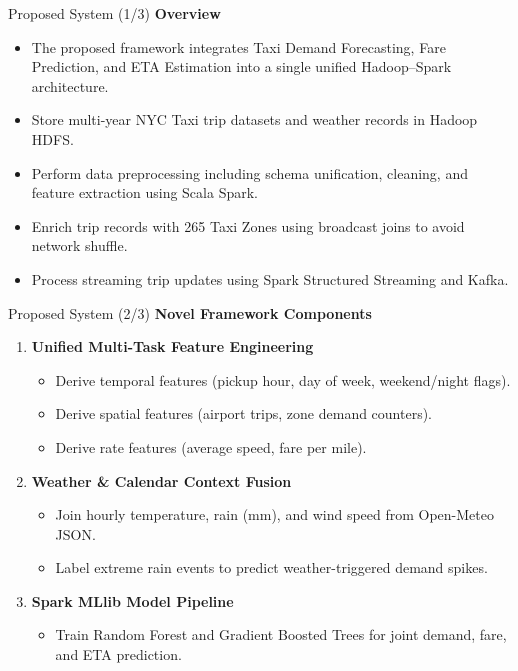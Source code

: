 \documentclass[aspectratio=169]{beamer}
\begin{document}
\begin{frame}{Proposed System (1/3)}
  \textbf{Overview}
  \begin{itemize}
    \item The proposed framework integrates Taxi Demand Forecasting, Fare Prediction, and ETA Estimation into a single unified Hadoop--Spark architecture.
    \item Store multi-year NYC Taxi trip datasets and weather records in Hadoop HDFS.
    \item Perform data preprocessing including schema unification, cleaning, and feature extraction using Scala Spark.
    \item Enrich trip records with 265 Taxi Zones using broadcast joins to avoid network shuffle.
    \item Process streaming trip updates using Spark Structured Streaming and Kafka.
  \end{itemize}
\end{frame}

\begin{frame}{Proposed System (2/3)}
  \textbf{Novel Framework Components}
  \vspace{6pt}
  \begin{enumerate}
    \item \textbf{Unified Multi-Task Feature Engineering}
      \begin{itemize}
        \item Derive temporal features (pickup hour, day of week, weekend/night flags).
        \item Derive spatial features (airport trips, zone demand counters).
        \item Derive rate features (average speed, fare per mile).
      \end{itemize}
    \addlinespace
    \item \textbf{Weather \& Calendar Context Fusion}
      \begin{itemize}
        \item Join hourly temperature, rain (mm), and wind speed from Open-Meteo JSON.
        \item Label extreme rain events to predict weather-triggered demand spikes.
      \end{itemize}
    \addlinespace
    \item \textbf{Spark MLlib Model Pipeline}
      \begin{itemize}
        \item Train Random Forest and Gradient Boosted Trees for joint demand, fare, and ETA prediction.
      \end{itemize}
  \end{enumerate}
\end{frame}
\end{document}
